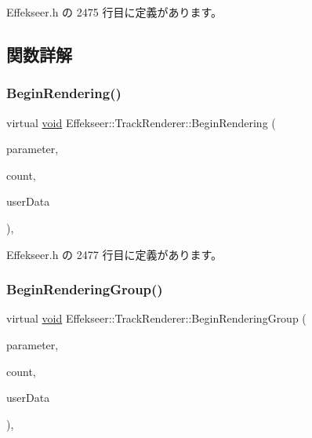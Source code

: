  Effekseer.\+h の 2475 行目に定義があります。



\subsection{関数詳解}
\mbox{\label{class_effekseer_1_1_track_renderer_ac252e85dddf2e8cc34b14dd00ab803b5}} 
\subsubsection{\texorpdfstring{Begin\+Rendering()}{BeginRendering()}}
{\footnotesize\ttfamily virtual \mbox{\hyperlink{namespace_effekseer_ab34c4088e512200cf4c2716f168deb56}{void}} Effekseer\+::\+Track\+Renderer\+::\+Begin\+Rendering (\begin{DoxyParamCaption}\item[{const \mbox{\hyperlink{struct_effekseer_1_1_track_renderer_1_1_node_parameter}{Node\+Parameter}} \&}]{parameter,  }\item[{int32\+\_\+t}]{count,  }\item[{\mbox{\hyperlink{namespace_effekseer_ab34c4088e512200cf4c2716f168deb56}{void}} $\ast$}]{user\+Data }\end{DoxyParamCaption})\hspace{0.3cm}{\ttfamily [inline]}, {\ttfamily [virtual]}}



 Effekseer.\+h の 2477 行目に定義があります。

\mbox{\label{class_effekseer_1_1_track_renderer_aabda9da7e26531ca02142af951865bcc}} 
\subsubsection{\texorpdfstring{Begin\+Rendering\+Group()}{BeginRenderingGroup()}}
{\footnotesize\ttfamily virtual \mbox{\hyperlink{namespace_effekseer_ab34c4088e512200cf4c2716f168deb56}{void}} Effekseer\+::\+Track\+Renderer\+::\+Begin\+Rendering\+Group (\begin{DoxyParamCaption}\item[{const \mbox{\hyperlink{struct_effekseer_1_1_track_renderer_1_1_node_parameter}{Node\+Parameter}} \&}]{parameter,  }\item[{int32\+\_\+t}]{count,  }\item[{\mbox{\hyperlink{namespace_effekseer_ab34c4088e512200cf4c2716f168deb56}{void}} $\ast$}]{user\+Data }\end{DoxyParamCaption})\hspace{0.3cm}{\ttfamily [inline]}, {\ttfamily [virtual]}}



